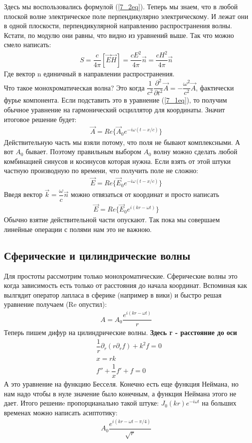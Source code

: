 	Здесь мы воспользовались формулой (\ref{7_2eq}). Теперь мы знаем, что в любой плоской волне электрическое поле перпендикулярно электрическому. И лежат они в одной плоскости, перпендикулярной направлению распространения волны. Кстати, по модулю они равны, что видно из уравнений выше. Так что можно смело написать:
	\begin{align*}
	S = \dfrac{c}{4\pi} [\vec{E} \vec{H}] = \dfrac{c E^2}{4\pi}\vec{n} = \dfrac{cH^2}{4\pi}\vec{n}
	\end{align*}
	Где вектор n единичный в направлении распространения. \\
	Что такое монохроматическая волна? Это когда $\dfrac{1}{c^2} \dfrac{\partial^2}{\partial t^2}\vec{A} =- \dfrac{\omega^2}{c^2} \vec{A}$, фактически фурье компонента. Если подставить это в уравнение (\ref{7_1eq}), то получим обычное уравнение на гармонический осциллятор для координаты. Значит итоговое решение будет:
	\begin{align*}
	\vec{A} = 	Re\{ \vec{A}_0 e^{-i \omega (t - x/c)}\}
	\end{align*}
	Действительную часть мы взяли потому, что поля не бывают комплексными. А вот $A_0$ бывает. Поэтому правильным выбором $A_0$ волну можно сделать любой комбинацией синусов и косинусов которая нужна. Если взять от этой штуки частную производную по времени, что получить поле не сложно:
	\begin{align*}
	\vec{E} = 	Re\{ \vec{E}_0 e^{-i \omega (t - x/c)}\}
	\end{align*}
	Введя вектор $\vec{k} = \dfrac{\omega}{c} \vec{n}$ можно отвязаться от координат и просто написать
	\begin{align*}
	\vec{E} = 	Re\{ \vec{E}_0 e^{i (kr - \omega t)}\}
	\end{align*}
	Обычно взятие действительной части опускают. Так пока мы совершаем линейные операции с полями нам это не важною.  \\
	\subsection*{Сферические и цилиндрические волны}
	Для простоты рассмотрим только монохроматические. Сферические волны это когда зависимость есть только от расстояния до начала координат. Вспоминая как вылгядит оператор лапласа в сферике (например в вики) и быстро решая уравнение получаем (Re опустил):
	\begin{align*}
	A = A_0 \dfrac{e^{i (kr - \omega t)}}{r}
	\end{align*}
	Теперь пишем дифур на цилиндрические волны. \textbf{Здесь r - расстояние до оси}
	\begin{align*}
	&\dfrac{1}{r} \partial_r (r \partial_r f) + k^2 f = 0\\
	& x = r k\\
	&f'' + \dfrac{1}{x} f' + f = 0
	\end{align*} 
	А это уравнение на функцию Бесселя. Конечно есть еще функция Неймана, но нам надо чтобы в нуле значение было конечным, а функция Неймана этого не дает. Итого решениe пропорцианально такой штуке: $J_0(k r) e^{-i\omega t}$ на больших временах можно написать асиптотику: 
	\begin{align*}
	A_0 \dfrac{e^{i (kr - \omega t - \pi/4)}}{\sqrt{r}}
	\end{align*}
